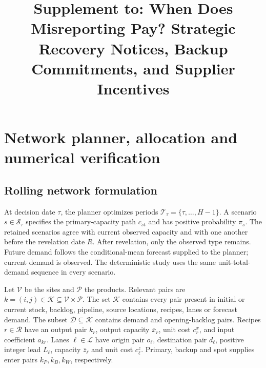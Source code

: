 \documentclass[preprint,11pt,authoryear]{elsarticle}
\begin{document}
\begin{frontmatter}
\title{Supplement to: When Does Misreporting Pay? Strategic Recovery Notices, Backup Commitments, and Supplier Incentives}
\end{frontmatter}
\appendix\setcounter{section}{1}
\section{Network planner, allocation and numerical verification}\label{app:planner}
\setcounter{equation}{0}
\renewcommand{\thetable}{B1}%
\subsection{Rolling network formulation}\label{app:network_formulation}
At decision date $\tau$, the planner optimizes periods $\mathcal T_\tau=\{\tau,\ldots,H-1\}$. A scenario $s\in\mathcal S_\tau$ specifies the primary-capacity path $c_{st}$ and has positive probability $\pi_s$. The retained scenarios agree with current observed capacity and with one another before the revelation date $R$. After revelation, only the observed type remains. Future demand follows the conditional-mean forecast supplied to the planner; current demand is observed. The deterministic study uses the same unit-total-demand sequence in every scenario.

Let $\mathcal V$ be the sites and $\mathcal P$ the products. Relevant pairs are $k=(i,j)\in\mathcal K\subseteq\mathcal V\times\mathcal P$. The set $\mathcal K$ contains every pair present in initial or current stock, backlog, pipeline, source locations, recipes, lanes or forecast demand. The subset $\mathcal D\subseteq\mathcal K$ contains demand and opening-backlog pairs. Recipes $r\in\mathcal R$ have an output pair $k_r$, output capacity $\bar x_r$, unit cost $c^x_r$, and input coefficient $a_{kr}$. Lanes $\ell\in\mathcal L$ have origin pair $o_\ell$, destination pair $d_\ell$, positive integer lead $L_\ell$, capacity $\bar z_\ell$ and unit cost $c^z_\ell$. Primary, backup and spot supplies enter pairs $k_P,k_B,k_W$, respectively.
\end{document}
